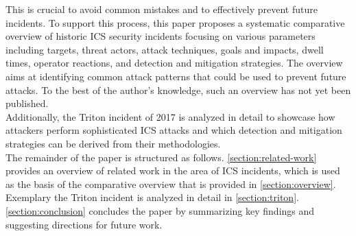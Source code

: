 \documentclass[runningheads]{llncs}
\begin{document}
This is crucial to avoid common mistakes and to effectively prevent future incidents.
To support this process, this paper proposes a systematic comparative overview of historic ICS security incidents focusing on various parameters including targets, threat actors, attack techniques, goals and impacts, dwell times, operator reactions, and detection and mitigation strategies.
The overview aims at identifying common attack patterns that could be used to prevent future attacks.
To the best of the author's knowledge, such an overview has not yet been published.\\
Additionally, the Triton incident of 2017 is analyzed in detail to showcase how attackers perform sophisticated ICS attacks and which detection and mitigation strategies can be derived from their methodologies.\\

The remainder of the paper is structured as follows.
\autoref{section:related-work} provides an overview of related work in the area of ICS incidents, which is used as the basis of the comparative overview that is provided in \autoref{section:overview}.
Exemplary the Triton incident is analyzed in detail in \autoref{section:triton}.
\autoref{section:conclusion} concludes the paper by summarizing key findings and suggesting directions for future work.
\end{document}

